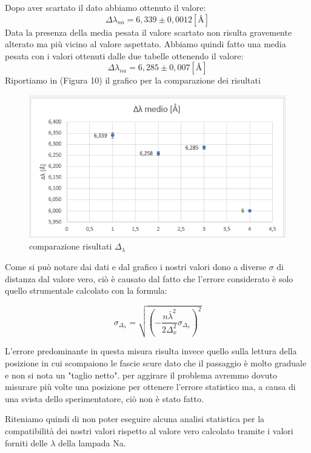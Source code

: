 \documentclass{article}
\begin{document}
Dopo aver scartato il dato abbiamo ottenuto il valore:
\[ \Delta \lambda_{na} = 6,339 \pm 0,0012 [\textrm{Å}] \]
Data la presenza della media pesata il valore scartato non risulta gravemente alterato ma più vicino al valore aspettato.
Abbiamo quindi fatto una media pesata con i valori ottenuti dalle due tabelle ottenendo il valore:
\[ \Delta \lambda_{na} = 6,285 \pm 0,007 [\textrm{Å}] \]
Riportiamo in (Figura 10) il grafico per la comparazione dei risultati


\begin{figure}[h!]
  \centering
  \includegraphics[width=0.6\linewidth]{IM grafico risultati delta lambda}
  \caption{comparazione risultati $\Delta_\lambda$}
\end{figure}


Come si può notare dai dati e dal grafico i nostri valori dono a diverse $\sigma$ di distanza dal valore vero, ciò è causato dal fatto che l'errore considerato è solo quello strumentale calcolato con la formula:

\begin{equation} 
\sigma_{\Delta_\lambda} = \sqrt{ ({-} \frac{n {\bar \lambda}^2}{2 \Delta_x^2} \sigma_{\Delta_x})^2} 
\end{equation}

L'errore predominante in questa misura risulta invece quello sulla lettura della posizione in cui scompaiono le fascie scure dato che il passaggio è molto graduale e non si nota un "taglio netto".%
 per aggirare il problema avremmo dovuto misurare più volte una posizione per ottenere l'errore statistico ma, a causa di una svista dello sperimentatore, ciò non è stato fatto. 

Riteniamo quindi di non poter eseguire alcuna analisi statistica per la compatibilità dei nostri valori rispetto al valore vero calcolato tramite i valori forniti delle $\lambda$ della lampada Na.
\end{document}
